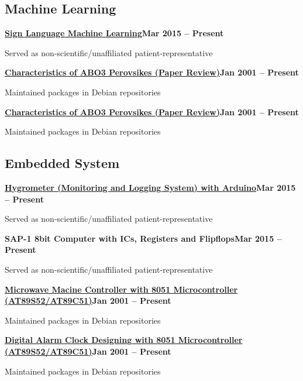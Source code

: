 \documentclass[letterpaper,10pt]{article}
\newcommand{\heading}[2]{
  \hspace{10pt}#1\hfill#2\\
}
\newcommand{\headingBf}[2]{
  \heading{\textbf{#1}}{\textbf{#2}}
}
\newenvironment{resume_list}{
  \vspace{-7pt}
  \begin{itemize}[itemsep=-2px, parsep=1pt, leftmargin=30pt]
}{
  \end{itemize}
}
\begin{document}
  \subsection{Machine Learning}
  
  \headingBf{\href{}{Sign Language Machine Learning}}{Mar 2015 -- Present}
  \begin{resume_list}
    \item Served as non-scientific/unaffiliated patient-representative
  \end{resume_list}

  \headingBf{\href{}{Characteristics of ABO3 Perovsikes (Paper Review)}}{Jan 2001 -- Present}
  \begin{resume_list}
    \item Maintained packages in Debian repositories
  \end{resume_list}

  \headingBf{\href{}{Characteristics of ABO3 Perovsikes (Paper Review)}}{Jan 2001 -- Present}
  \begin{resume_list}
    \item Maintained packages in Debian repositories
  \end{resume_list}

  \subsection{Embedded System}
  
  \headingBf{\href{}{Hygrometer (Monitoring and Logging System) with Arduino}}{Mar 2015 -- Present}
  \begin{resume_list}
    \item Served as non-scientific/unaffiliated patient-representative
  \end{resume_list}
 \headingBf{SAP-1 8bit Computer with ICs, Registers and Flipflops}{Mar 2015 -- Present}
  \begin{resume_list}
    \item Served as non-scientific/unaffiliated patient-representative
  \end{resume_list}

  \headingBf{\href{}{Microwave Macine Controller with 8051 Microcontroller (AT89S52/AT89C51)}}{Jan 2001 -- Present}
  \begin{resume_list}
    \item Maintained packages in Debian repositories
  \end{resume_list}

  \headingBf{\href{}{Digital Alarm Clock Designing with 8051 Microcontroller (AT89S52/AT89C51)}}{Jan 2001 -- Present}
  \begin{resume_list}
    \item Maintained packages in Debian repositories
  \end{resume_list}
  
\end{document}
